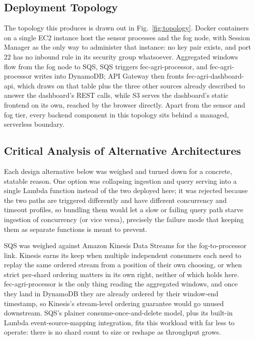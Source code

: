 \documentclass[conference]{IEEEtran}
\begin{document}
\subsection{Deployment Topology}
The topology this produces is drawn out in Fig.~\ref{fig:topology}. Docker containers on a single EC2 instance host the sensor processes and the fog node, with Session Manager as the only way to administer that instance: no key pair exists, and port 22 has no inbound rule in its security group whatsoever. Aggregated windows flow from the fog node to SQS, SQS triggers fec-agri-processor, and fec-agri-processor writes into DynamoDB; API Gateway then fronts fec-agri-dashboard-api, which draws on that table plus the three other sources already described to answer the dashboard's REST calls, while S3 serves the dashboard's static frontend on its own, reached by the browser directly. Apart from the sensor and fog tier, every backend component in this topology sits behind a managed, serverless boundary.

\subsection{Critical Analysis of Alternative Architectures}
Each design alternative below was weighed and turned down for a concrete, statable reason. One option was collapsing ingestion and query serving into a single Lambda function instead of the two deployed here; it was rejected because the two paths are triggered differently and have different concurrency and timeout profiles, so bundling them would let a slow or failing query path starve ingestion of concurrency (or vice versa), precisely the failure mode that keeping them as separate functions is meant to prevent.

SQS was weighed against Amazon Kinesis Data Streams for the fog-to-processor link. Kinesis earns its keep when multiple independent consumers each need to replay the same ordered stream from a position of their own choosing, or when strict per-shard ordering matters in its own right, neither of which holds here. fec-agri-processor is the only thing reading the aggregated windows, and once they land in DynamoDB they are already ordered by their window-end timestamp, so Kinesis's stream-level ordering guarantee would go unused downstream. SQS's plainer consume-once-and-delete model, plus its built-in Lambda event-source-mapping integration, fits this workload with far less to operate: there is no shard count to size or reshape as throughput grows.
\end{document}
